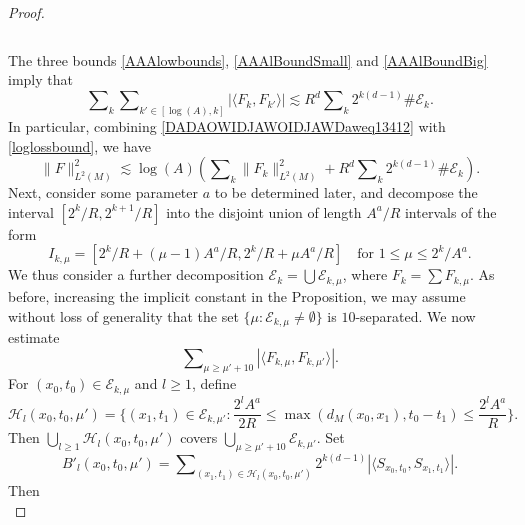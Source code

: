 \begin{proof}
\begin{itemize}
\begin{equation}
    \end{equation}
\end{itemize}
%
The three bounds \eqref{AAAlowbounds}, \eqref{AAAlBoundSmall} and \eqref{AAAlBoundBig} imply that
%
\begin{equation} \label{DADAOWIDJAWOIDJAWDaweq13412}
    \sum\nolimits_k \sum\nolimits_{k' \in [\log(A), k]} |\langle F_k, F_{k'} \rangle| \lesssim R^d \sum\nolimits_k 2^{k (d-1)} \# \mathcal{E}_k.
\end{equation}
%
In particular, combining \eqref{DADAOWIDJAWOIDJAWDaweq13412} with \eqref{loglossbound}, we have
%
\begin{equation} \label{DPOWADPAWKDPOWAKDOPWAK}
    \| F \|_{L^2(M)}^2 \lesssim \log(A) \left( \sum\nolimits_k \| F_k \|_{L^2(M)}^2 + R^d \sum\nolimits_k 2^{k (d-1)} \# \mathcal{E}_k \right).
\end{equation}
%
Next, consider some parameter $a$ to be determined later, and decompose the interval $[2^{k} / R, 2^{k+1} / R]$ into the disjoint union of length $A^a / R$ intervals of the form
%
\begin{equation}
    I_{k,\mu} = [ 2^{k} / R + (\mu - 1) A^a / R, 2^{k} / R + \mu A^a / R] \quad\text{for $1 \leq \mu \leq 2^k/A^a$}.
\end{equation}
%
We thus consider a further decomposition $\mathcal{E}_k = \bigcup \mathcal{E}_{k,\mu}$, where $F_k = \sum F_{k,\mu}$. As before, increasing the implicit constant in the Proposition, we may assume without loss of generality that the set $\{ \mu: \mathcal{E}_{k,\mu} \neq \emptyset \}$ is $10$-separated. We now estimate
%
\begin{equation}
    \sum\nolimits_{\mu \geq \mu' + 10} |\langle F_{k,\mu}, F_{k,\mu'} \rangle|.
\end{equation}
%
For $(x_0,t_0) \in \mathcal{E}_{k,\mu}$ and $l \geq 1$, define
%
\begin{equation}
    \mathcal{H}_l(x_0,t_0,\mu') = \Big\{ (x_1,t_1) \in \mathcal{E}_{k,\mu'} : \frac{2^l A^a}{2R} \leq \max(d_M(x_0,x_1), t_0 - t_1) \leq \frac{2^l A^a}{R} \Big\}.
\end{equation}
%
Then $\bigcup_{l \geq 1} \mathcal{H}_l(x_0,t_0,\mu')$ covers $\bigcup_{\mu \geq \mu' + 10} \mathcal{E}_{k,\mu'}$. Set
%
\begin{equation}
    B'_l(x_0,t_0,\mu') = \sum\nolimits_{(x_1,t_1) \in \mathcal{H}_l(x_0,t_0,\mu')} 2^{k(d-1)} |\langle {S\!}_{x_0,t_0}, {S\!}_{x_1,t_1} \rangle|.
\end{equation}
%
Then
%
\begin{equation}

\end{equation}
\end{proof}
